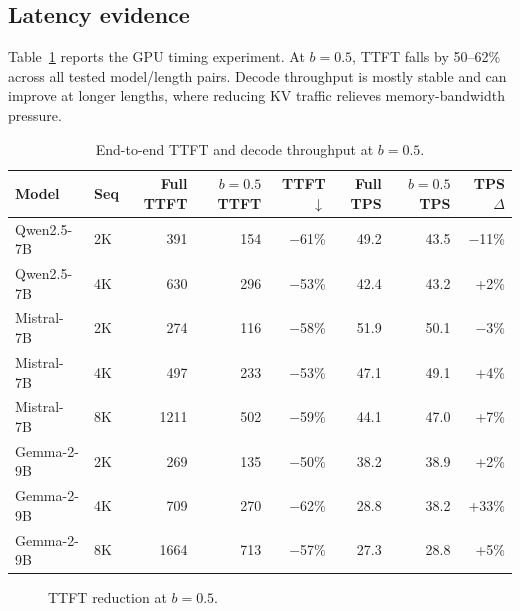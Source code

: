 \documentclass[11pt]{article}
\newcommand{\budget}{b}
\newcommand{\pct}{\%}
\theoremstyle{plain}
\theoremstyle{definition}
\begin{document}
\subsection{Latency evidence}
\label{sec:rq9}

Table~\ref{tab:latency} reports the GPU timing experiment.  At $\budget=0.5$, TTFT falls by 50--62\pct{} across all tested model/length pairs.  Decode throughput is mostly stable and can improve at longer lengths, where reducing KV traffic relieves memory-bandwidth pressure.

\begin{table}[t]
\centering
\caption{End-to-end TTFT and decode throughput at $\budget=0.5$.}
\label{tab:latency}
\small
\begin{tabular}{llrrrrrr}
\toprule
Model & Seq & Full TTFT & $\budget=0.5$ TTFT & TTFT $\downarrow$ & Full TPS & $\budget=0.5$ TPS & TPS $\Delta$ \\
\midrule
Qwen2.5-7B & 2K & 391 & 154 & $-$61\pct{} & 49.2 & 43.5 & $-$11\pct{} \\
Qwen2.5-7B & 4K & 630 & 296 & $-$53\pct{} & 42.4 & 43.2 & +2\pct{} \\
Mistral-7B & 2K & 274 & 116 & $-$58\pct{} & 51.9 & 50.1 & $-$3\pct{} \\
Mistral-7B & 4K & 497 & 233 & $-$53\pct{} & 47.1 & 49.1 & +4\pct{} \\
Mistral-7B & 8K & 1211 & 502 & $-$59\pct{} & 44.1 & 47.0 & +7\pct{} \\
Gemma-2-9B & 2K & 269 & 135 & $-$50\pct{} & 38.2 & 38.9 & +2\pct{} \\
Gemma-2-9B & 4K & 709 & 270 & $-$62\pct{} & 28.8 & 38.2 & +33\pct{} \\
Gemma-2-9B & 8K & 1664 & 713 & $-$57\pct{} & 27.3 & 28.8 & +5\pct{} \\
\bottomrule
\end{tabular}
\end{table}

\begin{figure}[H]
\centering
{}
\caption{TTFT reduction at $\budget=0.5$.}
\label{fig:ttft}
\end{figure}
\end{document}
